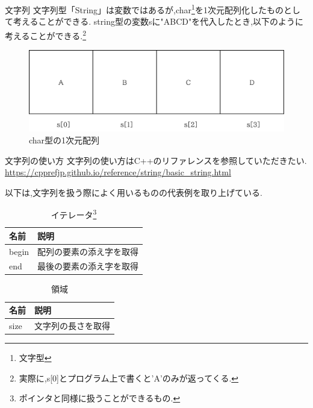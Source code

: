 \begin{frame}{文字列}
    文字列型「String」は変数ではあるが,char\footnote{文字型}を1次元配列化したものとして考えることができる.
    string型の変数sに"ABCD"を代入したとき,以下のように考えることができる.\footnote{実際に,s[0]とプログラム上で書くと'A'のみが返ってくる.}
    \begin{figure}[h]
        \centering
        \includegraphics[width=0.4\linewidth]{png/string.png}
        \caption{char型の1次元配列}
        \label{fig:enter-label}
    \end{figure}
\end{frame}

\begin{frame}{文字列の使い方}
    文字列の使い方はC++のリファレンスを参照していただきたい.
    \url{https://cpprefjp.github.io/reference/string/basic_string.html}
    
    以下は,文字列を扱う際によく用いるものの代表例を取り上げている.
    \begin{table}[h]
        \centering
        \begin{tabular}{|l|l|}
        \hline
        名前 & 説明 \\
        \hline
        begin & 配列の要素の添え字を取得\\
        end & 最後の要素の添え字を取得\\
        \hline
        \end{tabular}
        \caption{イテレータ\footnote{ポインタと同様に扱うことができるもの.}}
        \label{tab:my_label}
    \end{table}

    \begin{table}[h]
        \centering
        \begin{tabular}{|l|l|}
        \hline
        名前 & 説明\\
        \hline
        size & 文字列の長さを取得\\
        \hline
        \end{tabular}
        \caption{領域}
        \label{tab:my_label}
    \end{table}
\end{frame}

